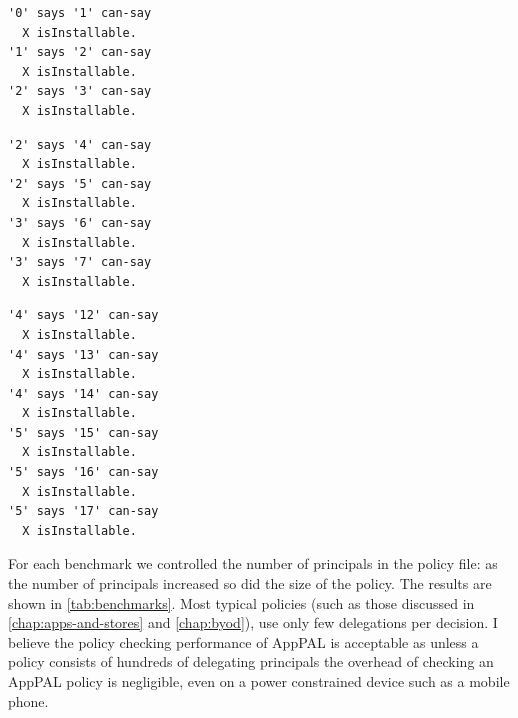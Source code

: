 \documentclass[thesis.tex]{subfiles}
\begin{document}
\noindent
\begin{minipage}{.32\textwidth}
\begin{lstlisting}[caption={Excerpt of policy from 1 to 1 benchmark.}, basicstyle=\ttfamily\footnotesize]
'0' says '1' can-say
  X isInstallable.
'1' says '2' can-say
  X isInstallable.
'2' says '3' can-say
  X isInstallable.
\end{lstlisting}
\end{minipage}\hfill
\begin{minipage}{.32\textwidth}
\begin{lstlisting}[caption={Excerpt of policy from 1 to 2 benchmark.}, basicstyle=\ttfamily\footnotesize]
'2' says '4' can-say
  X isInstallable.
'2' says '5' can-say
  X isInstallable.
'3' says '6' can-say
  X isInstallable.
'3' says '7' can-say
  X isInstallable.
\end{lstlisting}
\end{minipage}\hfill
\begin{minipage}{.32\textwidth}
\begin{lstlisting}[caption={Excerpt of policy from 1 to 3 benchmark.}, basicstyle=\ttfamily\footnotesize]
'4' says '12' can-say
  X isInstallable.
'4' says '13' can-say
  X isInstallable.
'4' says '14' can-say
  X isInstallable.
'5' says '15' can-say
  X isInstallable.
'5' says '16' can-say
  X isInstallable.
'5' says '17' can-say
  X isInstallable.
\end{lstlisting}
\end{minipage}

For each benchmark we controlled the number of principals in the policy file:
as the number of principals increased so did the size of the policy.
The results are shown in \autoref{tab:benchmarks}.
Most typical policies (such as those discussed in \autoref{chap:apps-and-stores} and \autoref{chap:byod}), use only few delegations per decision.
I believe the policy checking performance of AppPAL is acceptable as unless a policy consists of hundreds of delegating principals the overhead of checking an AppPAL policy is negligible, even on a power constrained device such as a mobile phone.
\end{document}
